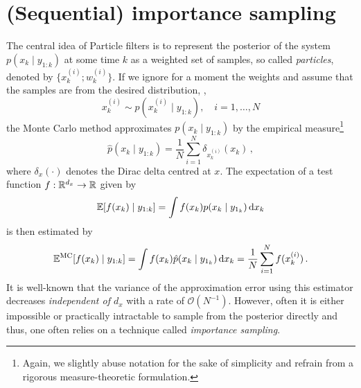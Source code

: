 \section*{(Sequential) importance sampling}
The central idea of Particle filters is to represent the posterior of
the system $p(x_k \mid y_{1:k})$ at some time $k$ as a weighted set of
samples, so called \emph{particles}, denoted by
$\{ x^{(i)}_k; w^{(i)}_k \}$. If we ignore for a moment the weights
and assume that the samples are from the desired distribution, \ie,
\[
  x^{(i)}_k \sim p(x_k^{(i)} \mid y_{1:k}), \quad i = 1, \dotsc, N
\]
the Monte Carlo method approximates $p(x_k \mid y_{1:k})$ by the
empirical measure\footnote{Again, we slightly abuse notation for the
  sake of simplicity and refrain from a rigorous measure-theoretic
  formulation.}
\begin{equation}
  \label{eq:empirical_measure}
  \hat{p}(x_k \mid y_{1:k}) = \frac{1}{N} \sum_{i = 1}^N
  \delta_{x_k^{(i)}}(x_k)\,,
\end{equation}
where $\delta_x(\cdot)$ denotes the Dirac delta centred at $x$. The
expectation of a test function $f : \mathbb{R}^{d_x} \rightarrow \mathbb{R}$ given by
\[
  \mathbb{E}[f(x_k) \mid y_{1:k}] = \int f(x_k) p(x_k \mid y_{1_k})
  \,\mathrm{d}x_k
\]
is then estimated by
\[
  {\mathbb{E}}^{\text{MC}}[f(x_k) \mid y_{1:k}] = \int f(x_k)
  \hat{p}(x_k \mid y_{1_k}) \,\mathrm{d}x_k = \frac{1}{N} \sum_{i=1}^N
  f(x^{(i)}_k)\,.
\]
It is well-known that the variance of the approximation error using
this estimator decreases \emph{independent of $d_x$} with a rate of
$\mathcal{O}(N^{-1})$. However, often it is either impossible or
practically intractable to sample from the posterior directly and
thus, one often relies on a technique called \emph{importance
  sampling}.

